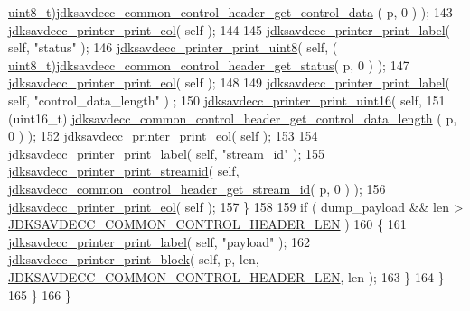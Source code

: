 \begin{DoxyCode}
      \hyperlink{stdint_8h_aba7bc1797add20fe3efdf37ced1182c5}{uint8\_t})\hyperlink{group__jdksavdecc__avtp__common__control__header_gacb435e5d647474931972cb9eb93b4e41}{jdksavdecc\_common\_control\_header\_get\_control\_data}
      ( p, 0 ) );
143                 \hyperlink{group__util_gacda56c9d3d24593a52c999682fa6e6e3}{jdksavdecc\_printer\_print\_eol}( \textcolor{keyword}{self} );
144 
145                 \hyperlink{group__util_gaf7818b24143b3c7502926a425a242ff5}{jdksavdecc\_printer\_print\_label}( \textcolor{keyword}{self}, \textcolor{stringliteral}{"status"} );
146                 \hyperlink{group__util_ga00205f7730fc39a5b93655a3b18a8dc7}{jdksavdecc\_printer\_print\_uint8}( \textcolor{keyword}{self}, (
      \hyperlink{stdint_8h_aba7bc1797add20fe3efdf37ced1182c5}{uint8\_t})\hyperlink{group__jdksavdecc__avtp__common__control__header_ga4a4d44fa74bdb873eab982d74862273c}{jdksavdecc\_common\_control\_header\_get\_status}( p, 0
       ) );
147                 \hyperlink{group__util_gacda56c9d3d24593a52c999682fa6e6e3}{jdksavdecc\_printer\_print\_eol}( \textcolor{keyword}{self} );
148 
149                 \hyperlink{group__util_gaf7818b24143b3c7502926a425a242ff5}{jdksavdecc\_printer\_print\_label}( \textcolor{keyword}{self}, \textcolor{stringliteral}{"control\_data\_length"} )
      ;
150                 \hyperlink{group__util_ga9793e0ff8e7ed25d957282ee6b257ce2}{jdksavdecc\_printer\_print\_uint16}( \textcolor{keyword}{self},
151                                                  (uint16\_t)
      \hyperlink{group__jdksavdecc__avtp__common__control__header_ga2d89ba7b9520f61839d222bdb2494e24}{jdksavdecc\_common\_control\_header\_get\_control\_data\_length}
      ( p, 0 ) );
152                 \hyperlink{group__util_gacda56c9d3d24593a52c999682fa6e6e3}{jdksavdecc\_printer\_print\_eol}( \textcolor{keyword}{self} );
153 
154                 \hyperlink{group__util_gaf7818b24143b3c7502926a425a242ff5}{jdksavdecc\_printer\_print\_label}( \textcolor{keyword}{self}, \textcolor{stringliteral}{"stream\_id"} );
155                 \hyperlink{group__util_ga8439b1cdb450c02010bc8318643f67a2}{jdksavdecc\_printer\_print\_streamid}( \textcolor{keyword}{self}, 
      \hyperlink{group__jdksavdecc__avtp__common__control__header_ga99181000ee374936c8518f657fa9f5cd}{jdksavdecc\_common\_control\_header\_get\_stream\_id}( p, 0 ) );
156                 \hyperlink{group__util_gacda56c9d3d24593a52c999682fa6e6e3}{jdksavdecc\_printer\_print\_eol}( \textcolor{keyword}{self} );
157             \}
158 
159             \textcolor{keywordflow}{if} ( dump\_payload && len > \hyperlink{group__jdksavdecc__avtp__common__control__header_gaae84052886fb1bb42f3bc5f85b741dff}{JDKSAVDECC\_COMMON\_CONTROL\_HEADER\_LEN}
       )
160             \{
161                 \hyperlink{group__util_gaf7818b24143b3c7502926a425a242ff5}{jdksavdecc\_printer\_print\_label}( \textcolor{keyword}{self}, \textcolor{stringliteral}{"payload"} );
162                 \hyperlink{group__util_ga18d7b11e396f21996dedde77febcb22f}{jdksavdecc\_printer\_print\_block}( \textcolor{keyword}{self}, p, len, 
      \hyperlink{group__jdksavdecc__avtp__common__control__header_gaae84052886fb1bb42f3bc5f85b741dff}{JDKSAVDECC\_COMMON\_CONTROL\_HEADER\_LEN}, len );
163             \}
164         \}
165     \}
166 \}
\end{DoxyCode}


